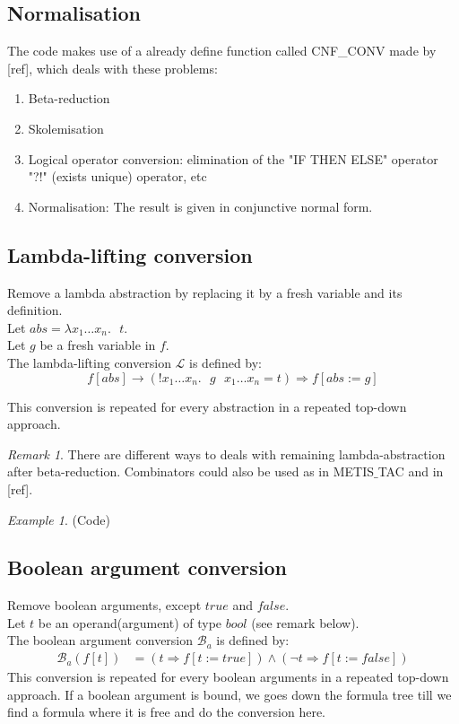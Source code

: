\documentclass[a4paper, 11pt]{article}
\theoremstyle{plain}
\theoremstyle{definition}
\theoremstyle{remark}
\newtheorem*{remark}{Remark}
\newtheorem*{example}{Example}
\begin{document}
\subsection{Normalisation} 
The code makes use of a already define function called CNF{\_}CONV made by [ref], which deals with these problems:
\begin{enumerate}
  \item Beta-reduction  
  \item Skolemisation
  \item Logical operator conversion:  elimination of the 
  "IF THEN ELSE" operator  "?!" (exists unique) operator, etc
  \item Normalisation: The result is given in conjunctive normal form.
\end{enumerate}

\subsection{Lambda-lifting conversion}
Remove a lambda abstraction by replacing it by a fresh variable and its definition.
\\Let $abs = \lambda x_1 \ldots x_n.\mbox{ } t$.
\\Let $g$ be a fresh variable in $f$.
\\The lambda-lifting conversion $\mathcal{L}$ is defined by:
\[f[abs] \longrightarrow 
  (!x_1 \ldots x_n.\mbox{ } g\mbox{ }x_1 \ldots x_n = t) 
  \Rightarrow f[abs := g] \]

This conversion is repeated for every abstraction in a repeated top-down approach.

\begin{remark}
There are different ways to deals with remaining lambda-abstraction after beta-reduction. Combinators could also be used as in METIS$\_$TAC and in [ref].
\end{remark}

\begin{example} (Code)   
 
\end{example}


  
\subsection{Boolean argument conversion}
Remove boolean arguments, except $true$ and $false$.
\\Let $t$ be an operand(argument) of type $bool$ (see remark below).
\\The boolean argument conversion $\mathcal{B}_a$ is defined by: 
\[\begin{aligned}
  \mathcal{B}_a (f[t]) &= (t \Rightarrow f[t := true]) \wedge (\neg t \Rightarrow f[t := false]) 
\end{aligned}\]
This conversion is repeated for every boolean arguments in a repeated top-down approach. If a boolean argument is bound, we goes down the formula tree till we find a formula where it is free and do the conversion here.
\end{document}
